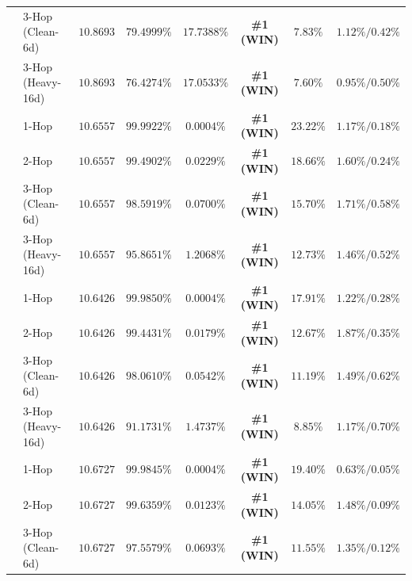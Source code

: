 \documentclass[11pt,letterpaper]{article}
\theoremstyle{definition}
\begin{document}
\begin{table}[!htbp]
{\begin{tabular}{@{}llcccccc@{}}
 & 3-Hop (Clean-6d)  & $10.8693$ & $\mathbf{79.4999\%}$ & $17.7388\%$ & \textbf{\#1 (WIN)} & $7.83\%$  & $1.12\% / 0.42\%$ \\
 & 3-Hop (Heavy-16d) & $10.8693$ & $\mathbf{76.4274\%}$ & $17.0533\%$ & \textbf{\#1 (WIN)} & $7.60\%$  & $0.95\% / 0.50\%$ \\
\midrule
{}
 & 1-Hop             & $10.6557$ & $\mathbf{99.9922\%}$ & $0.0004\%$ & \textbf{\#1 (WIN)} & $23.22\%$ & $1.17\% / 0.18\%$ \\
 & 2-Hop             & $10.6557$ & $\mathbf{99.4902\%}$ & $0.0229\%$ & \textbf{\#1 (WIN)} & $18.66\%$ & $1.60\% / 0.24\%$ \\
 & 3-Hop (Clean-6d)  & $10.6557$ & $\mathbf{98.5919\%}$ & $\mathbf{0.0700\%}$ & \textbf{\#1 (WIN)} & $15.70\%$ & $1.71\% / 0.58\%$ \\
 & 3-Hop (Heavy-16d) & $10.6557$ & $\mathbf{95.8651\%}$ & $1.2068\%$ & \textbf{\#1 (WIN)} & $12.73\%$ & $1.46\% / 0.52\%$\\
\midrule
{}
 & 1-Hop             & $10.6426$ & $99.9850\%$ & $0.0004\%$ & \textbf{\#1 (WIN)} & $17.91\%$ & $1.22\% / 0.28\%$ \\
 & 2-Hop             & $10.6426$ & $99.4431\%$ & $0.0179\%$ & \textbf{\#1 (WIN)} & $12.67\%$ & $1.87\% / 0.35\%$ \\
 & 3-Hop (Clean-6d)  & $10.6426$ & $\mathbf{98.0610\%}$ & $\mathbf{0.0542\%}$ & \textbf{\#1 (WIN)} & $11.19\%$ & $1.49\% / 0.62\%$ \\
 & 3-Hop (Heavy-16d) & $10.6426$ & $\mathbf{91.1731\%}$ & $1.4737\%$ & \textbf{\#1 (WIN)} & $8.85\%$  & $1.17\% / 0.70\%$\\
\midrule
{}
 & 1-Hop             & $10.6727$ & $99.9845\%$ & $0.0004\%$ & \textbf{\#1 (WIN)} & $19.40\%$ & $0.63\% / 0.05\%$ \\
 & 2-Hop             & $10.6727$ & $\mathbf{99.6359\%}$ & $0.0123\%$ & \textbf{\#1 (WIN)} & $14.05\%$ & $1.48\% / 0.09\%$ \\
 & 3-Hop (Clean-6d)  & $10.6727$ & $\mathbf{97.5579\%}$ & $0.0693\%$ & \textbf{\#1 (WIN)} & $11.55\%$ & $1.35\% / 0.12\%$ \\

\end{tabular}}
\end{table}
\end{document}
